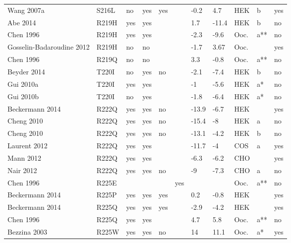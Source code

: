 \begin{tiny}
\begin{longtable}{p{4cm}|l|llll|ll|lll}
Wang 2007a\cite{Wang2007aMutationDB} & S216L & no & yes & yes &  & -0.2 & 4.7 & HEK & b & yes \\
Abe 2014\cite{Abe2014MutationDB} & R219H & yes & yes &  &  & 1.7 & -11.4 & HEK & b & no \\
Chen 1996\cite{Chen1996MutationDB} & R219H & yes & yes &  &  & -2.3 & -9.6 & Ooc. & a** & no \\
Gosselin-Badaroudine 2012\cite{GosselinBadaroudine2012MutationDB} & R219H & no & no &  &  & -1.7 & 3.67 & Ooc. &  & yes \\
Chen 1996\cite{Chen1996MutationDB} & R219Q & no & no &  &  & 3.3 & -0.8 & Ooc. & a** & no \\
Beyder 2014\cite{Beyder2014MutationDB} & T220I & no & yes & no &  & -2.1 & -7.4 & HEK & b & no \\
Gui 2010a\cite{Gui2010aMutationDB} & T220I & yes & yes &  &  & -1 & -5.6 & HEK & a* & no \\
Gui 2010b\cite{Gui2010bMutationDB} & T220I & no & yes &  &  & -1.8 & -6.4 & HEK & a* & no \\
Beckermann 2014\cite{Beckermann2014MutationDB} & R222Q & yes & yes & no &  & -13.9 & -6.7 & HEK &  & yes \\
Cheng 2010\cite{Cheng2010MutationDB} & R222Q & yes & yes & no &  & -15.4 & -8 & HEK & a & no \\
Cheng 2010\cite{Cheng2010MutationDB} & R222Q & yes & yes & no &  & -13.1 & -4.2 & HEK & b & no \\
Laurent 2012\cite{Laurent2012MutationDB} & R222Q & yes & yes &  &  & -11.7 & -4 & COS & a & yes \\
Mann 2012\cite{Mann2012MutationDB} & R222Q & yes & yes &  &  & -6.3 & -6.2 & CHO &  & yes \\
Nair 2012\cite{Nair2012MutationDB} & R222Q & yes & yes & no &  & -9 & -7.3 & CHO & a & no \\
Chen 1996\cite{Chen1996MutationDB} & R225E &  &  &  & yes &  &  & Ooc. & a** & no \\
Beckermann 2014\cite{Beckermann2014MutationDB} & R225P & yes & yes & yes &  & 0.2 & -0.8 & HEK &  & yes \\
Beckermann 2014\cite{Beckermann2014MutationDB} & R225Q & yes & yes & yes &  & -2.9 & -4.2 & HEK &  & yes \\
Chen 1996\cite{Chen1996MutationDB} & R225Q & yes & yes &  &  & 4.7 & 5.8 & Ooc. & a** & no \\
Bezzina 2003\cite{Bezzina2003MutationDB} & R225W & yes & yes & no &  & 14 & 11.1 & Ooc. & a* & yes \\

\end{longtable}
\end{tiny}
